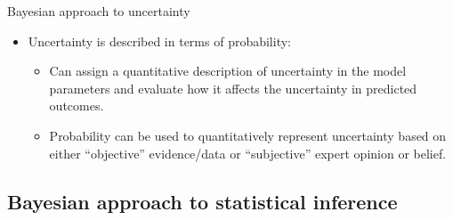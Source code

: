 \documentclass[handout]{beamer}
\begin{document}
\begin{frame}{Bayesian approach to uncertainty}

\begin{itemize}
\item Uncertainty is described in terms of probability:
\begin{itemize}
 \item Can assign a quantitative description of uncertainty in the model parameters and evaluate how it affects the uncertainty in predicted outcomes.
\item Probability can be used to quantitatively represent uncertainty based on either “objective” evidence/data or “subjective” expert opinion or belief.
\end{itemize}
\end{itemize}
\vspace{-0.35in}

\end{frame}

\subsection{Bayesian approach to statistical inference}
\end{document}
